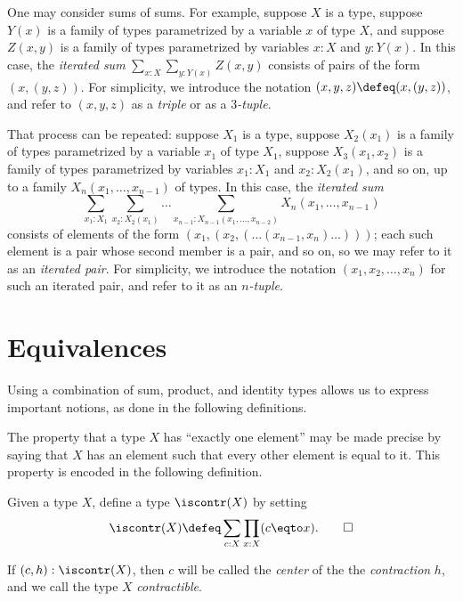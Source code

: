 \begin{remark}
  \label{iterated-sums}
  One may consider sums of sums.  For example, suppose $X$ is a type, suppose $Y(x)$ is a family of types parametrized by a variable $x$ of type $X$,
  and suppose $Z(x,y)$ is a family of types parametrized by variables $x:X$ and $y:Y(x)$.  In this case, the \emph{iterated sum}
  $\sum _{x:X} \sum_{y:Y(x)} Z(x,y)$ consists of pairs of the form $(x,(y,z))$.  For simplicity, we introduce the notation
  $(x,y,z) \defeq (x,(y,z))$, and refer to $(x,y,z)$ as a \emph{triple} or as a \emph{$3$-tuple}.

  That process can be repeated: suppose $X_1$ is a type, suppose $X_2(x_1)$ is a family of types parametrized by a variable $x_1$ of type $X_1$,
  suppose $X_3(x_1,x_2)$ is a family of types parametrized by variables $x_1:X_1$ and $x_2:X_2(x_1)$, and so on, up to a family
  $X_n(x_1,\dots,x_{n-1})$ of types.  In this case, the \emph{iterated sum}
  $$\sum _{x_1:X_1} \sum_{x_2:X_2(x_1)} \dots \sum_{x_{n-1}:X_{n-1}(x_1,\dots,x_{n-2})} X_n(x_1,\dots,x_{n-1}) $$
  consists of elements of the form
  $(x_1,(x_2,(\dots (x_{n-1},x_n)\dots)))$; each such element is a pair whose second member is a pair, and so on, so we may refer to it as an \emph{iterated pair}.
  For simplicity, we introduce the notation $(x_1,x_2,\dots,x_n)$ for such an iterated pair, and refer to it as an \emph{$n$-tuple}.
\end{remark}

\section{Equivalences}\label{sec:equivalence}

Using a combination of sum, product, and identity types allows
us to express important notions, as done in the following
definitions.

The property that a type $X$ has ``exactly one element'' may be made precise by saying that $X$ has an element such that every other element is equal to it.
This property is encoded in the following definition.

\begin{definition}
  \label{def:contractible}
  Given a type $X$, define a type $\iscontr(X)$ by setting
  \[
    \iscontr(X) \defeq \sum_{c:X} \prod_{x:X} (c \eqto x).\qedhere
  \]
\end{definition}

If $ (c,h) : \iscontr(X) $, then $c$ will be called the \emph{center} of the
the \emph{contraction} $h$, and we call the type $X$ \emph{contractible}.

